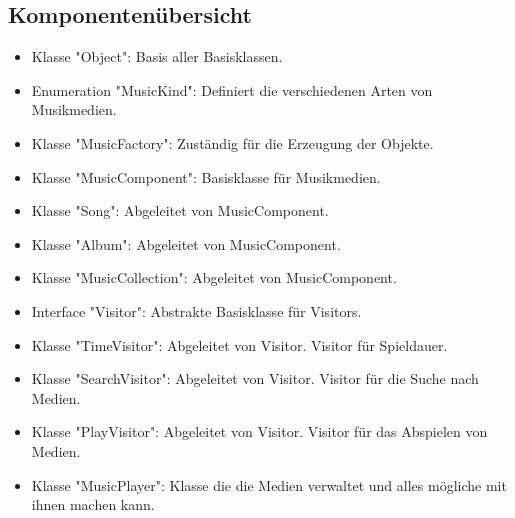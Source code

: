\documentclass[12pt,a4paper]{article}
\begin{document}
\subsection {Komponentenübersicht}
\begin {itemize} 
	\item Klasse "Object":
	\newline
	Basis aller Basisklassen.
	
	\item Enumeration "MusicKind":
	\newline
	Definiert die verschiedenen Arten von Musikmedien.

	\item Klasse "MusicFactory":
	\newline
	Zuständig für die Erzeugung der Objekte.

	\item Klasse "MusicComponent":
	\newline
	Basisklasse für Musikmedien.

	\item Klasse "Song":
	\newline
	Abgeleitet von MusicComponent.
	
	\item Klasse "Album":
	\newline
	Abgeleitet von MusicComponent.

	\item Klasse "MusicCollection":
	\newline
	Abgeleitet von MusicComponent.
	
	\item Interface "Visitor":
	\newline	
	Abstrakte Basisklasse für Visitors.
	
	\item Klasse "TimeVisitor":
	\newline
	Abgeleitet von Visitor. Visitor für Spieldauer.
	
	\item Klasse "SearchVisitor":
	\newline
	Abgeleitet von Visitor. Visitor für die Suche nach Medien.
	
	\item Klasse "PlayVisitor":
	\newline
	Abgeleitet von Visitor. Visitor für das Abspielen von Medien.

	\item Klasse "MusicPlayer":
	\newline
	Klasse die die Medien verwaltet und alles mögliche mit ihnen machen kann.
		
\end {itemize}
\end{document}
